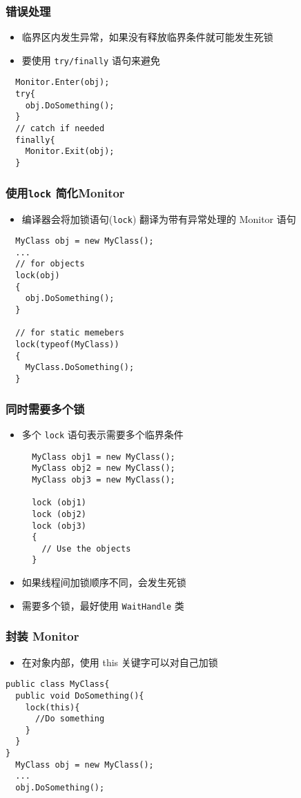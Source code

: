 \begin{frame}[fragile]
\frametitle{错误处理}
\begin{itemize}
\item 临界区内发生异常，如果没有释放临界条件就可能发生死锁
\item 要使用 \texttt{try/finally} 语句来避免
\end{itemize}
\begin{lstlisting}
  Monitor.Enter(obj);
  try{
    obj.DoSomething();
  }
  // catch if needed
  finally{
    Monitor.Exit(obj);
  }
\end{lstlisting}
\end{frame}

\begin{frame}[fragile]
\frametitle{使用\texttt{lock} 简化Monitor}
\begin{itemize}
\item 编译器会将加锁语句(\texttt{lock}) 翻译为带有异常处理的 Monitor 语句
\end{itemize}
\begin{lstlisting}
  MyClass obj = new MyClass();
  ...
  // for objects
  lock(obj)
  {
    obj.DoSomething();
  }

  // for static memebers
  lock(typeof(MyClass))
  {
    MyClass.DoSomething();
  }
\end{lstlisting}
\end{frame}

\begin{frame}[fragile]
\frametitle{同时需要多个锁}
\begin{itemize}
\item 多个 \texttt{lock} 语句表示需要多个临界条件
\begin{lstlisting}
  MyClass obj1 = new MyClass();
  MyClass obj2 = new MyClass();
  MyClass obj3 = new MyClass();
  
  lock (obj1)
  lock (obj2)
  lock (obj3)
  {
    // Use the objects
  }
\end{lstlisting}
\item 如果线程间加锁顺序不同，会发生死锁
\item 需要多个锁，最好使用 \texttt{WaitHandle} 类
\end{itemize}
\end{frame}

\begin{frame}[fragile]
\frametitle{封装 Monitor}
\begin{itemize}
\item 在对象内部，使用 this 关键字可以对自己加锁
\end{itemize}
\begin{lstlisting}
public class MyClass{
  public void DoSomething(){
    lock(this){
      //Do something
    }
  }
}
  MyClass obj = new MyClass();
  ...
  obj.DoSomething();  

\end{lstlisting}
\end{frame}


